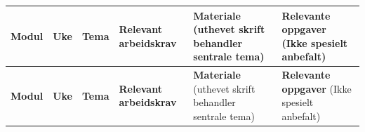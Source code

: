 \documentclass[10pt,a4paper]{article}
\begin{document}
\begin{longtable}{
  |>{\centering\arraybackslash}m{2.2cm}
  |>{\centering\arraybackslash}m{0.8cm}
  |>{\raggedright\arraybackslash}m{4.6cm}
  |>{\centering\arraybackslash}m{1.8cm}
  |>{\raggedright\arraybackslash}m{9.2cm}
  |>{\raggedright\arraybackslash}m{7.0cm}|
}
\hline
\rowcolor{fpHeader}
\textbf{Modul} & \textbf{Uke} & \textbf{Tema} & \textbf{Relevant arbeidskrav} & \textbf{Materiale} \newline \footnotesize(uthevet skrift behandler sentrale tema) & \textbf{Relevante oppgaver} \newline \footnotesize(Ikke spesielt anbefalt) \\
\hline
\endfirsthead
\hline
\rowcolor{fpHeader}
\textbf{Modul} & \textbf{Uke} & \textbf{Tema} & \textbf{Relevant arbeidskrav} & \textbf{Materiale} \newline \footnotesize(uthevet skrift behandler sentrale tema) & \textbf{Relevante oppgaver} \newline \footnotesize(Ikke spesielt anbefalt) \\
\hline
\endhead


\end{longtable}
\end{document}
